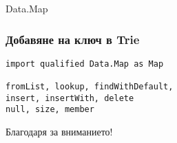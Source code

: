 \documentclass{beamer}
\begin{document}
\begin{frame}[fragile]
\begin{columns}[t]
\begin{column}{0.80\textwidth}
  \end{column}
\end{columns}

\end{frame}


\begin{frame}
  \centerline{Data.Map}
\end{frame}

\begin{frame}[fragile]
  \frametitle{Добавяне на ключ в Trie}
\begin{verbatim}
import qualified Data.Map as Map

fromList, lookup, findWithDefault, 
insert, insertWith, delete
null, size, member
\end{verbatim}
\end{frame}

\begin{frame}
  \centerline{Благодаря за вниманието!}
\end{frame}
\end{document}
